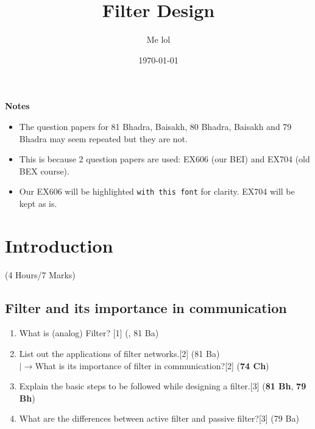\documentclass[12pt]{article}
\title{Filter Design}
\author{Me lol}
\date{\today}
\newcommand{\lb}{\\$\left|\rightarrow\right.$}
\begin{document}
\maketitle
\vspace{10cm}
\textbf{Notes}
\begin{itemize}
\item The question papers for 81 Bhadra, Baisakh, 80 Bhadra, Baisakh and 79 Bhadra may seem repeated but they are not.
\item This is because 2 question papers are used: EX606 (our BEI) and EX704 (old BEX course).
\item Our EX606 will be highlighted \texttt{with this font} for clarity. EX704 will be kept as is.
\end{itemize}
\pagebreak
\tableofcontents
\pagebreak

\section{Introduction}
	\begin{center}(4 Hours/7 Marks)\end{center}
	\subsection{Filter and its importance in communication}
		\begin{enumerate}
			\item What is (analog) Filter? \hfill [1] (, 81 Ba)
			\item List out the applications of filter networks.\hfill[2] (81 Ba)
			\lb What is its importance of filter in communication?\hfill[2] (\textbf{74 Ch})
			\item Explain the basic steps to be followed while designing a filter.\hfill[3] (\textbf{81 Bh}, \textbf{79 Bh})
			\item What are the differences between active filter and passive filter?\hfill[3] (79 Ba)
		\end{enumerate}
		
\end{document}
